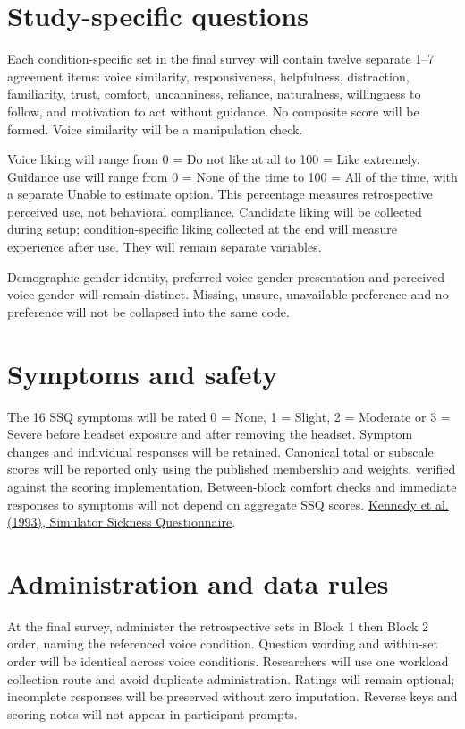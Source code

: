 \documentclass[11pt,letterpaper]{article}
\begin{document}
\section{Study-specific questions}
Each condition-specific set in the final survey will contain twelve separate 1--7 agreement items: voice similarity, responsiveness, helpfulness, distraction, familiarity, trust, comfort, uncanniness, reliance, naturalness, willingness to follow, and motivation to act without guidance. No composite score will be formed. Voice similarity will be a manipulation check.

Voice liking will range from 0 = Do not like at all to 100 = Like extremely. Guidance use will range from 0 = None of the time to 100 = All of the time, with a separate Unable to estimate option. This percentage measures retrospective perceived use, not behavioral compliance. Candidate liking will be collected during setup; condition-specific liking collected at the end will measure experience after use. They will remain separate variables.

Demographic gender identity, preferred voice-gender presentation and perceived voice gender will remain distinct. Missing, unsure, unavailable preference and no preference will not be collapsed into the same code.

\section{Symptoms and safety}
The 16 SSQ symptoms will be rated 0 = None, 1 = Slight, 2 = Moderate or 3 = Severe before headset exposure and after removing the headset. Symptom changes and individual responses will be retained. Canonical total or subscale scores will be reported only using the published membership and weights, verified against the scoring implementation. Between-block comfort checks and immediate responses to symptoms will not depend on aggregate SSQ scores.
\href{https://doi.org/10.1207/s15327108ijap0303_3}{Kennedy et al. (1993), Simulator Sickness Questionnaire}.

\section{Administration and data rules}
At the final survey, administer the retrospective sets in Block 1 then Block 2 order, naming the referenced voice condition. Question wording and within-set order will be identical across voice conditions. Researchers will use one workload collection route and avoid duplicate administration. Ratings will remain optional; incomplete responses will be preserved without zero imputation. Reverse keys and scoring notes will not appear in participant prompts.
\end{document}
